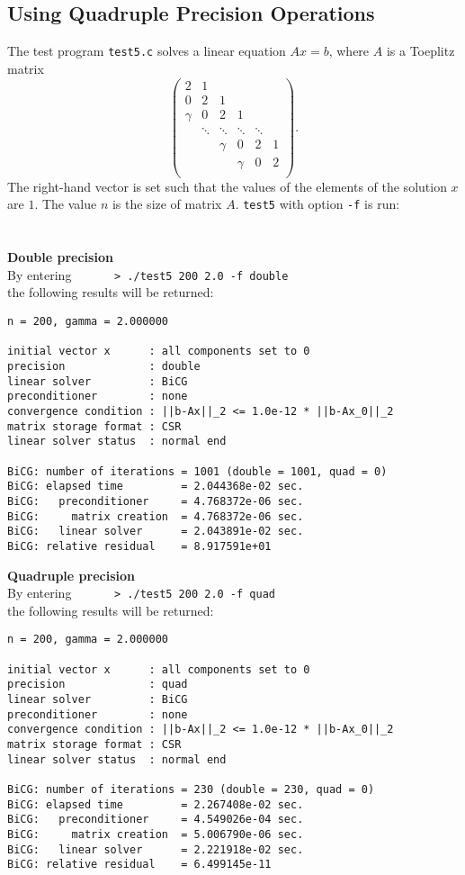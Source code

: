 \documentclass[a4paper]{article}
\begin{document}
\subsection{Using Quadruple Precision Operations}
\label{sec:testprog5}
The test program \verb|test5.c| solves a linear equation $Ax =b$, where $A$ is a Toeplitz matrix
\[
\left(
\begin{array}{cccccc}
2 & 1 &   &  &  & \\
0 & 2 & 1 &  &  & \\
\gamma & 0& 2 & 1 &  & \\
 & \ddots & \ddots & \ddots & \ddots & \\
 &  &   \gamma &0 &       2   & 1 \\
 &  &  &   \gamma & 0& 2 \\
\end{array}
\right).
\]
The right-hand vector is set such that the values of the elements 
of the solution $x$ are $1$. The value $n$ is the size of matrix $A$.
\verb|test5| with option {\tt -f} is run: \\
\\ \\
\noindent
{\bf Double precision}\\
By entering
\verb+      > ./test5 200 2.0 -f double+\\
the following results will be returned:

\begin{verbatim}
n = 200, gamma = 2.000000

initial vector x      : all components set to 0
precision             : double
linear solver         : BiCG
preconditioner        : none
convergence condition : ||b-Ax||_2 <= 1.0e-12 * ||b-Ax_0||_2
matrix storage format : CSR
linear solver status  : normal end

BiCG: number of iterations = 1001 (double = 1001, quad = 0)
BiCG: elapsed time         = 2.044368e-02 sec.
BiCG:   preconditioner     = 4.768372e-06 sec. 
BiCG:     matrix creation  = 4.768372e-06 sec.
BiCG:   linear solver      = 2.043891e-02 sec.
BiCG: relative residual    = 8.917591e+01
\end{verbatim}

\noindent
{\bf Quadruple precision}\\
By entering
\verb+      > ./test5 200 2.0 -f quad+\\
the following results will be returned:

\begin{verbatim}
n = 200, gamma = 2.000000

initial vector x      : all components set to 0
precision             : quad
linear solver         : BiCG
preconditioner        : none
convergence condition : ||b-Ax||_2 <= 1.0e-12 * ||b-Ax_0||_2
matrix storage format : CSR
linear solver status  : normal end

BiCG: number of iterations = 230 (double = 230, quad = 0)
BiCG: elapsed time         = 2.267408e-02 sec.
BiCG:   preconditioner     = 4.549026e-04 sec. 
BiCG:     matrix creation  = 5.006790e-06 sec.
BiCG:   linear solver      = 2.221918e-02 sec.
BiCG: relative residual    = 6.499145e-11
\end{verbatim}
\end{document}
